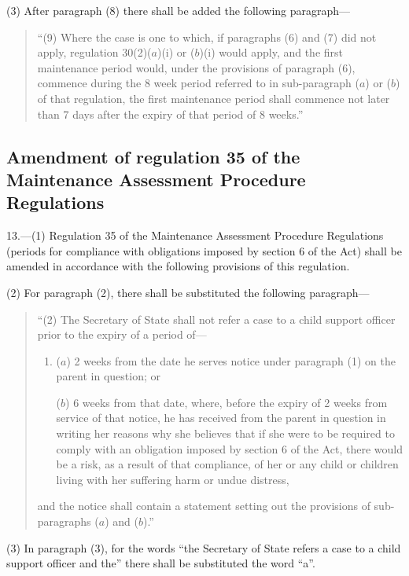 \documentclass[a4paper]{article}
\begin{document}
(3) After paragraph (8) there shall be added the following paragraph—
\begin{quotation}
“(9) Where the case is one to which, if paragraphs (6) and (7) did not apply, regulation 30(2)($a$)(i) or ($b$)(i) would apply, and the first maintenance period would, under the provisions of paragraph (6), commence during the 8 week period referred to in sub-paragraph ($a$) or ($b$) of that regulation, the first maintenance period shall commence not later than 7 days after the expiry of that period of 8 weeks.”
\end{quotation}

\subsection[13. Amendment of regulation 35 of the Maintenance Assessment Procedure Regulations]{Amendment of regulation 35 of the Maintenance Assessment Procedure Regulations}

13.—(1) Regulation 35 of the Maintenance Assessment Procedure Regulations (periods for compliance with obligations imposed by section 6 of the Act) shall be amended in accordance with the following provisions of this regulation.

(2) For paragraph (2), there shall be substituted the following paragraph—
\begin{quotation}
“(2) The Secretary of State shall not refer a case to a child support officer prior to the expiry of a period of—
\begin{enumerate}\item[]
($a$) 2 weeks from the date he serves notice under paragraph (1) on the parent in question; or

($b$) 6 weeks from that date, where, before the expiry of 2 weeks from service of that notice, he has received from the parent in question in writing her reasons why she believes that if she were to be required to comply with an obligation imposed by section 6 of the Act, there would be a risk, as a result of that compliance, of her or any child or children living with her suffering harm or undue distress,
\end{enumerate}
and the notice shall contain a statement setting out the provisions of sub-paragraphs ($a$) and ($b$).”
\end{quotation}

(3) In paragraph (3), for the words “the Secretary of State refers a case to a child support officer and the” there shall be substituted the word “a”.
\end{document}
